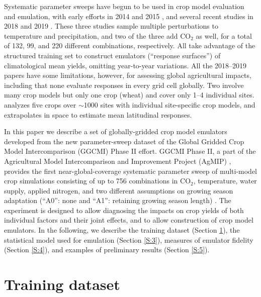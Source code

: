 \documentclass[gmdd]{copernicus} %
\begin{document}
Systematic parameter sweeps have begun to be used in crop model evaluation and emulation, with early efforts in 2014 and 2015 \citep{ruane2014, Markowski2015, Pirttioja2015}, and several recent studies in 2018 and 2019 \citep{FRONZEK20182, RUIZRAMOS2018,Snyder2018}. 
These three studies sample multiple perturbations to temperature and precipitation, and two of the three add CO$_2$ as well, for a total of 132, 99, and 220 different combinations, respectively. 
All take advantage of the structured training set to construct emulators (``response surfaces'') of climatological mean yields, omitting year-to-year variations. 
All the 2018--2019 papers have some limitations, however, for assessing global agricultural impacts, including that
none evaluate responses in every grid cell globally.
Two involve many crop models but only one crop (wheat) \citep{FRONZEK20182,RUIZRAMOS2018} and cover only 1--4 individual sites. 
\citet{Snyder2018} analyzes five crops over $\sim$1000 sites with individual site-specific crop models, and extrapolates in space to estimate mean latitudinal responses.

In this paper we describe a set of globally-gridded crop model emulators developed from the new parameter-sweep dataset of the Global Gridded Crop Model Intercomparison (GGCMI) Phase II effort. 
GGCMI Phase II, a part of the Agricultural Model Intercomparison and Improvement Project (AgMIP) \citep{ROSENZWEIG2013, Rosenzweig2014}, provides the first near-global-coverage systematic parameter sweep of multi-model crop simulations consisting of up to 756 combinations in CO$_2$, temperature, water supply, applied nitrogen, and two different assumptions on growing season adaptation (``A0'': none and ``A1'': retaining growing season length) \citep[CTWN-A,][]{franke2019ctwnexperiment,minoli2019adaptation}.
The experiment is designed to allow diagnosing the impacts on crop yields of both individual factors and their joint effects, and to allow construction of crop model emulators.
In the following, we describe the training dataset (Section \ref{S:2}), the statistical model used for emulation (Section \ref{S:3}), measures of emulator fidelity (Section \ref{S:4}), and examples of preliminary results (Section \ref{S:5}). 

\section{Training dataset}
\label{S:2}
\end{document}
